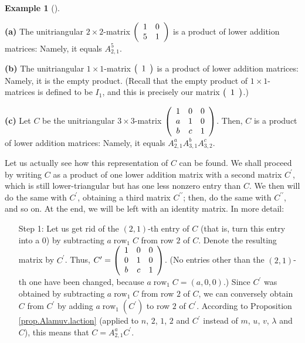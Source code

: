 \documentclass[numbers=enddot,12pt,final,onecolumn,notitlepage]{scrartcl}%
\theoremstyle{definition}
\newtheorem{exam}[theo]{Example}
\newenvironment{example}[1][]
{\begin{exam}[#1]\begin{leftbar}}
{\end{leftbar}\end{exam}}
\begin{document}
\begin{example}
\label{exam.thm.triangular.Alamuv}\textbf{(a)} The unitriangular $2\times
2$-matrix $\left(
\begin{array}
[c]{cc}%
1 & 0\\
5 & 1
\end{array}
\right)  $ is a product of lower addition matrices: Namely, it equals
$A_{2,1}^{5}$.

\textbf{(b)} The unitriangular $1\times1$-matrix $\left(
\begin{array}
[c]{c}%
1
\end{array}
\right)  $ is a product of lower addition matrices: Namely, it is the empty
product. (Recall that the empty product of $1\times1$-matrices is defined to
be $I_{1}$, and this is precisely our matrix $\left(
\begin{array}
[c]{c}%
1
\end{array}
\right)  $.)

\textbf{(c)} Let $C$ be the unitriangular $3\times3$-matrix $\left(
\begin{array}
[c]{ccc}%
1 & 0 & 0\\
a & 1 & 0\\
b & c & 1
\end{array}
\right)  $. Then, $C$ is a product of lower addition matrices: Namely, it
equals $A_{2,1}^{a}A_{3,1}^{b}A_{3,2}^{c}$.

Let us actually see how this representation of $C$ can be found. We shall
proceed by writing $C$ as a product of one lower addition matrix with a second
matrix $C^{\prime}$, which is still lower-triangular but has one less nonzero
entry than $C$. We then will do the same with $C^{\prime}$, obtaining a third
matrix $C^{\prime\prime}$; then, do the same with $C^{\prime\prime}$, and so
on. At the end, we will be left with an identity matrix. In more detail:

\begin{enumerate}
\item[Step 1:] Let us get rid of the $\left(  2,1\right)  $-th entry of $C$
(that is, turn this entry into a $0$) by subtracting $a\operatorname*{row}%
\nolimits_{1}C$ from row $2$ of $C$. Denote the resulting matrix by
$C^{\prime}$. Thus, $C^{\prime}=\left(
\begin{array}
[c]{ccc}%
1 & 0 & 0\\
0 & 1 & 0\\
b & c & 1
\end{array}
\right)  $. (No entries other than the $\left(  2,1\right)  $-th one have been
changed, because $a\operatorname*{row}\nolimits_{1}C=\left(  a,0,0\right)  $.)
Since $C^{\prime}$ was obtained by subtracting $a\operatorname*{row}%
\nolimits_{1}C$ from row $2$ of $C$, we can conversely obtain $C$ from
$C^{\prime}$ by adding $a\operatorname*{row}\nolimits_{1}\left(  C^{\prime
}\right)  $ to row $2$ of $C^{\prime}$. According to Proposition
\ref{prop.Alamuv.laction} (applied to $n$, $2$, $1$, $2$ and $C^{\prime}$
instead of $m$, $u$, $v$, $\lambda$ and $C$), this means that $C=A_{2,1}%
^{a}C^{\prime}$.


\end{enumerate}
\end{example}
\end{document}
